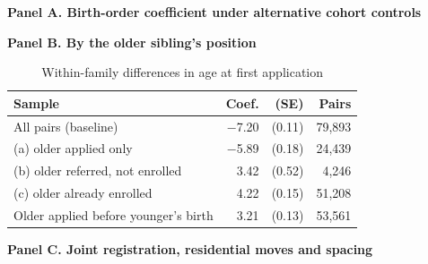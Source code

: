 \begin{table}[htbp]\centering
\caption{Within-family differences in age at first application}
\label{tab:S5_robustez}
\label{tab:P4stage}
\label{tab:siblingsN2}
\footnotesize
\par\medskip\textbf{Panel A. Birth-order coefficient under alternative cohort controls}\par\smallskip
{}
\par\medskip\textbf{Panel B. By the older sibling's position}\par\smallskip
\begin{tabular}{lrrr}
\toprule
Sample & Coef. & (SE) & Pairs \\
\midrule
All pairs (baseline) & $-$7.20 & (0.11) & 79,893 \\
(a) older applied only & $-$5.89 & (0.18) & 24,439 \\
(b) older referred, not enrolled & 3.42 & (0.52) & 4,246 \\
(c) older already enrolled & 4.22 & (0.15) & 51,208 \\
Older applied before younger's birth & 3.21 & (0.13) & 53,561 \\
\bottomrule
\end{tabular}
\par\medskip\textbf{Panel C. Joint registration, residential moves and spacing}\par\smallskip

\end{table}
